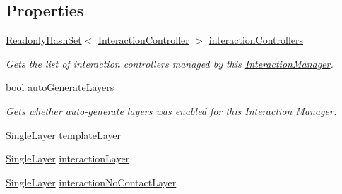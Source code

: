\subsection*{Properties}
\begin{DoxyCompactItemize}
\item 
\mbox{\hyperlink{struct_leap_1_1_unity_1_1_readonly_hash_set}{Readonly\+Hash\+Set}}$<$ \mbox{\hyperlink{class_leap_1_1_unity_1_1_interaction_1_1_interaction_controller}{Interaction\+Controller}} $>$ \mbox{\hyperlink{class_leap_1_1_unity_1_1_interaction_1_1_interaction_manager_a8946daadeba0069746b6db6aff5c1ea8}{interaction\+Controllers}}
\begin{DoxyCompactList}\small\item\em Gets the list of interaction controllers managed by this \mbox{\hyperlink{class_leap_1_1_unity_1_1_interaction_1_1_interaction_manager}{Interaction\+Manager}}. \end{DoxyCompactList}\item 
bool \mbox{\hyperlink{class_leap_1_1_unity_1_1_interaction_1_1_interaction_manager_a9444a5cee976bad9ae36b128f9f26ba7}{auto\+Generate\+Layers}}
\begin{DoxyCompactList}\small\item\em Gets whether auto-\/generate layers was enabled for this \mbox{\hyperlink{namespace_leap_1_1_unity_1_1_interaction}{Interaction}} Manager. \end{DoxyCompactList}\item 
\mbox{\hyperlink{struct_leap_1_1_unity_1_1_single_layer}{Single\+Layer}} \mbox{\hyperlink{class_leap_1_1_unity_1_1_interaction_1_1_interaction_manager_a08c617c31954540a87088b1b65250859}{template\+Layer}}
\item 
\mbox{\hyperlink{struct_leap_1_1_unity_1_1_single_layer}{Single\+Layer}} \mbox{\hyperlink{class_leap_1_1_unity_1_1_interaction_1_1_interaction_manager_abeed762876c9d024999e75142a523c80}{interaction\+Layer}}
\item 
\mbox{\hyperlink{struct_leap_1_1_unity_1_1_single_layer}{Single\+Layer}} \mbox{\hyperlink{class_leap_1_1_unity_1_1_interaction_1_1_interaction_manager_af684f38e796818e34bf5c9bcc50f0ebe}{interaction\+No\+Contact\+Layer}}

\end{DoxyCompactItemize}
